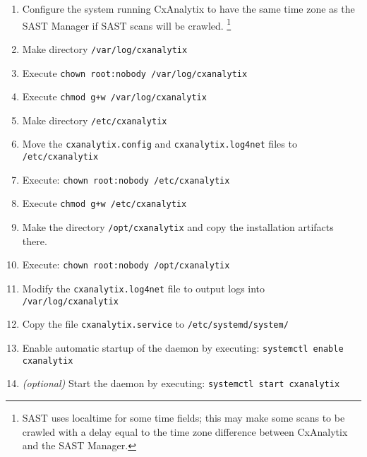 \begin{enumerate}
    \item Configure the system running CxAnalytix to have the same time zone as the SAST Manager if SAST scans will be crawled.
    \footnote{SAST uses localtime for some time fields; this may make some scans to be 
    crawled with a delay equal to the time zone difference between CxAnalytix and the SAST Manager.}

    \item Make directory \texttt{/var/log/cxanalytix}

    \item Execute \texttt{chown root:nobody /var/log/cxanalytix}

    \item Execute \texttt{chmod g+w /var/log/cxanalytix}

    \item Make directory \texttt{/etc/cxanalytix}

    \item Move the \texttt{cxanalytix.config} and \texttt{cxanalytix.log4net} files to \texttt{/etc/cxanalytix}

    \item Execute: \texttt{chown root:nobody /etc/cxanalytix}

    \item Execute \texttt{chmod g+w /etc/cxanalytix}

    \item Make the directory \texttt{/opt/cxanalytix} and copy the installation artifacts there.

    \item Execute: \texttt{chown root:nobody /opt/cxanalytix}

    \item Modify the \texttt{cxanalytix.log4net} file to output logs into \texttt{/var/log/cxanalytix}
    
    \item Copy the file \texttt{cxanalytix.service} to \texttt{/etc/systemd/system/}

    \item Enable automatic startup of the daemon by executing: \texttt{systemctl enable cxanalytix}

    \item \textit{(optional)} Start the daemon by executing: \texttt{systemctl start cxanalytix}

\end{enumerate}


